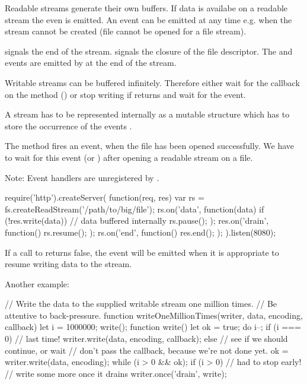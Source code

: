 Readable streams generate their own buffers. If data is availabe on a readable
stream the even  is emitted. An  event can be
emitted at any time e.g. when the stream cannot be created (file cannot be
opened for a file stream).

 signals the end of the stream.  signals the closure of
the file descriptor. The  and  events are emitted by
 at the end of the stream.

Writable streams can be buffered infinitely. Therefore either wait for the
callback on the  method () or stop writing
if  returns  and wait for the  event.

A stream has to be represented internally as a mutable structure which has to
store the occurrence of the events .

The method  fires an  event, when the
file has been opened successfully. We have to wait for this event (or
) after opening a readable stream on a file.

Note: Event handlers are unregistered by .

\begin{js}
  require('http').createServer( function(req, res) {
    var rs = fs.createReadStream('/path/to/big/file');
    rs.on('data', function(data) {
      if (!res.write(data)) { // data buffered internally
        rs.pause();}
    });
    res.on('drain', function() {
      rs.resume();
    });
    rs.on('end', function() {
      res.end();
    });
  }).listen(8080);
\end{js}

If a call to  returns false, the  event will be
emitted when it is appropriate to resume writing data to the stream.


Another example:
\begin{js}
  // Write the data to the supplied writable stream one million times.
  // Be attentive to back-pressure.
  function writeOneMillionTimes(writer, data, encoding, callback) {
    let i = 1000000;
    write();
    function write() {
      let ok = true;
      do {
        i--;
        if (i === 0) {
          // last time!
          writer.write(data, encoding, callback);
        } else {
          // see if we should continue, or wait
          // don't pass the callback, because we're not done yet.
          ok = writer.write(data, encoding);
        }
      } while (i > 0 && ok);
      if (i > 0) {
        // had to stop early!
        // write some more once it drains
        writer.once('drain', write);
      }
    }
  }
\end{js}












